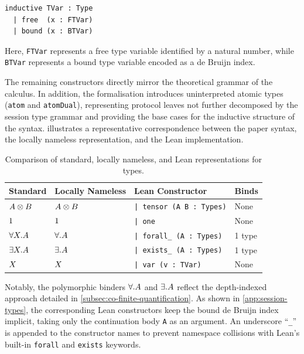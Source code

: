 \begin{lstlisting}[language=Lean4]
inductive TVar : Type
  | free  (x : FTVar)   
  | bound (x : BTVar)   
\end{lstlisting}

Here, \texttt{FTVar} represents a free type variable identified by a natural number, while \texttt{BTVar} represents a bound type variable encoded as a de Bruijn index.

The remaining constructors directly mirror the theoretical grammar of the calculus. In addition, the formalisation introduces uninterpreted atomic types (\texttt{atom} and \texttt{atomDual}), representing protocol leaves not further decomposed by the session type grammar and providing the base cases for the inductive structure of the syntax.  illustrates a representative correspondence between the paper syntax, the locally nameless representation, and the Lean implementation.

\begin{highlight}
\begin{table}[htbp]  
    \centering
    \caption{Comparison of standard, locally nameless, and Lean representations for \pill{} types.}
    \label{tab:types-comparison}
    \begin{tabular}{llll}
        \toprule
        \textbf{Standard} & \textbf{Locally Nameless} & \textbf{Lean Constructor} & \textbf{Binds} \\
        \midrule
        $A \otimes B$ & $A \otimes B$         & \texttt{| tensor (A B~: Types)} & None \\
        $1$           & $1$                   & \texttt{| one}                  & None \\
        $\forall X.A$ & $\forall. A$ & \texttt{| forall\_ (A~: Types)} & 1 type \\
        $\exists X.A$ & $\exists. A$ & \texttt{| exists\_ (A~: Types)} & 1 type \\
        $X$           & $X$                   & \texttt{| var (v~: TVar)}       & None \\
        \bottomrule
    \end{tabular}
\end{table}
\end{highlight}

Notably, the polymorphic binders {$\forall.A$} and {$\exists.A$} reflect the depth-indexed approach detailed in \cref{subsec:co-finite-quantification}. As shown in \cref{app:session-types}, the corresponding Lean constructors keep the bound de Bruijn index implicit, taking only the continuation body \texttt{A} as an argument. An underscore ``\texttt{\_}'' is appended to the constructor names to prevent namespace collisions with Lean's built-in \texttt{forall} and \texttt{exists} keywords.

